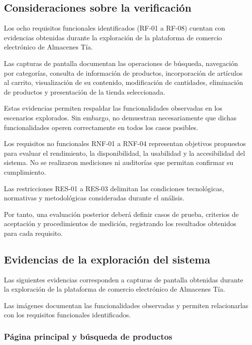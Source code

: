 \subsection{Consideraciones sobre la verificación}


Los ocho requisitos funcionales identificados
(RF-01 a RF-08) cuentan con evidencias obtenidas
durante la exploración de la plataforma de
comercio electrónico de Almacenes Tía.

Las capturas de pantalla documentan las
operaciones de búsqueda, navegación por
categorías, consulta de información de
productos, incorporación de artículos al
carrito, visualización de su contenido,
modificación de cantidades, eliminación
de productos y presentación de la tienda
seleccionada.

Estas evidencias permiten respaldar las
funcionalidades observadas en los escenarios
explorados. Sin embargo, no demuestran
necesariamente que dichas funcionalidades
operen correctamente en todos los casos
posibles.

Los requisitos no funcionales RNF-01 a RNF-04
representan objetivos propuestos para evaluar
el rendimiento, la disponibilidad, la
usabilidad y la accesibilidad del sistema.
No se realizaron mediciones ni auditorías
que permitan confirmar su cumplimiento.

Las restricciones RES-01 a RES-03 delimitan
las condiciones tecnológicas, normativas
y metodológicas consideradas durante
el análisis.

Por tanto, una evaluación posterior deberá
definir casos de prueba, criterios de
aceptación y procedimientos de medición,
registrando los resultados obtenidos
para cada requisito.



\subsection{Evidencias de la exploración del sistema}

Las siguientes evidencias corresponden a capturas
de pantalla obtenidas durante la exploración de
la plataforma de comercio electrónico de
Almacenes Tía.

Las imágenes documentan las funcionalidades
observadas y permiten relacionarlas con los
requisitos funcionales identificados.

\subsubsection{Página principal y búsqueda de productos}

